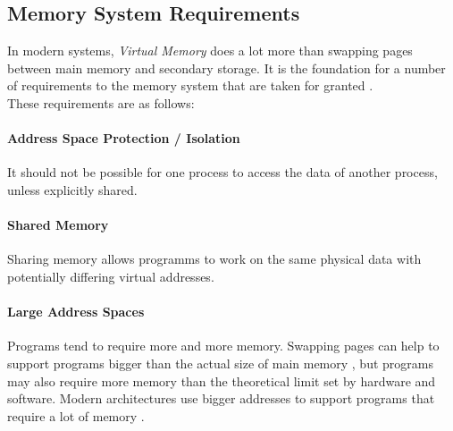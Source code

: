 \subsection{Memory System Requirements}
In modern systems, \textit{Virtual Memory} does a lot more than swapping pages between main memory and secondary
storage. It is the foundation for a number of requirements to the memory system that are taken for granted
\cite{jacobSoftwaremanagedAddressTranslation1997}.\\
These requirements are as follows:


\paragraph{Address Space Protection / Isolation} It should not be possible for one process to access the data
of another process, unless explicitly shared.
\cite{jacobVirtualMemoryContemporary1998}


\paragraph{Shared Memory} Sharing memory allows programms to work on the same physical data with potentially
differing virtual addresses.
\cite{jacobVirtualMemoryContemporary1998}


\paragraph{Large Address Spaces} Programs tend to require more and more memory. Swapping pages can help
to support programs bigger than the actual size of main memory \cite{tanenbaumOS}, but programs may
also require more memory than the theoretical limit set by hardware and software. Modern architectures
use bigger addresses to support programs that require a lot of memory \cite{jacobSoftwaremanagedAddressTranslation1997, jacobVirtualMemoryContemporary1998}.



